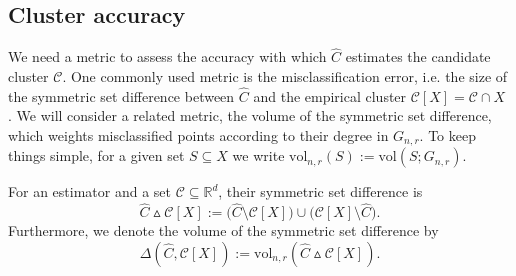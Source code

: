 \documentclass[11pt,twoside]{article}
\newcommand{\Reals}{\mathbb{R}}
\newcommand{\1}{\mathbf{1}}
\newcommand{\Rd}{\Reals^d}
\newcommand{\mc}[1]{\mathcal{#1}}
\newcommand{\wh}[1]{\widehat{#1}}
\newcommand{\vol}{\mathrm{vol}}
\begin{document}
\subsection{Cluster accuracy}
We need a metric to assess the accuracy with which $\wh{C}$ estimates the candidate cluster $\mc{C}$. One commonly used metric is the misclassification error, i.e. the size of the symmetric set difference
between $\wh{C}$ and the empirical cluster $\mc{C}[X] = \mc{C} \cap X$ \citep{korostelev1993,polonik1995,rigollet2009}. We
will consider a related metric, the volume of the symmetric set difference,
which weights misclassified points according to their degree in $G_{n,r}$. To keep things simple, for a given set $S \subseteq X$ we write $\vol_{n,r}(S) := \vol(S;G_{n,r})$. 
\begin{definition}
	\label{def:volume_symmetric_set_difference}
	For an estimator \smash{$\wh{C} \subseteq X$} and a set 
	$\mathcal{C} \subseteq \Rd$, their symmetric set difference is 
	\begin{equation*}
	\wh{C} \vartriangle \mathcal{C}[X] :=
	\bigl(\wh{C} \setminus \mathcal{C}[X]\bigr) \cup
	\bigl(\mathcal{C}[X] \setminus \wh{C}\bigr).
	\end{equation*}
	Furthermore, we denote the volume of the symmetric set difference by 
	$$
	\Delta(\wh{C}, \mathcal{C}[X]) := \vol_{n,r}(\wh{C} \vartriangle \mathcal{C}[X]). 
	$$
\end{definition}
\end{document}
